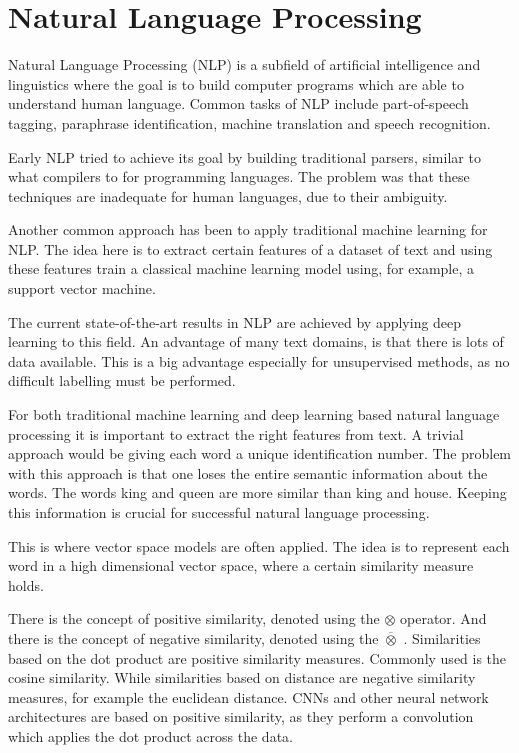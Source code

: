\documentclass[draft,final,oneside]{vutinfth} %
\begin{document}
\section{Natural Language Processing}
Natural Language Processing (NLP) is a subfield of artificial intelligence and linguistics where the goal is to build computer programs which are able to understand human language. Common tasks of NLP include part-of-speech tagging, paraphrase identification, machine translation and speech recognition.

Early NLP tried to achieve its goal by building traditional parsers, similar to what compilers to for programming languages. The problem was that these techniques are inadequate for human languages, due to their ambiguity.

Another common approach has been to apply traditional machine learning for NLP. The idea here is to extract certain features of a dataset of text and using these features train a classical machine learning model using, for example, a support vector machine.

The current state-of-the-art results in NLP are achieved by applying deep learning to this field. An advantage of many text domains, is that there is lots of data available. This is a big advantage especially for unsupervised methods, as no difficult labelling must be performed.

For both traditional machine learning and deep learning based natural language processing it is important to extract the right features from text. A trivial approach would be giving each word a unique identification number. The problem with this approach is that one loses the entire semantic information about the words. The words king and queen are more similar than king and house. Keeping this information is crucial for successful natural language processing.

This is where vector space models are often applied. The idea is to represent each word in a high dimensional vector space, where a certain similarity measure holds.

There is the concept of positive similarity, denoted using the $\otimes$ operator. And there is the concept of negative similarity, denoted using the $\overline{\otimes}$ \cite{TUW-233295}. Similarities based on the dot product are positive similarity measures. Commonly used is the cosine similarity. While similarities based on distance are negative similarity measures, for example the euclidean distance. CNNs and other neural network architectures are based on positive similarity, as they perform a convolution which applies the dot product across the data.
\end{document}
